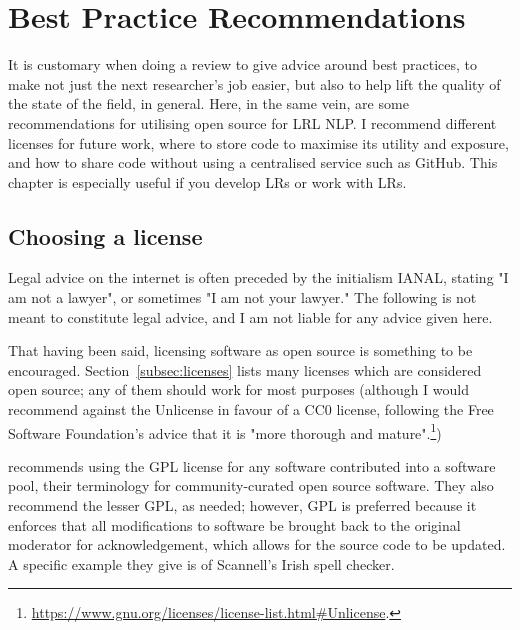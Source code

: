 \section{Best Practice Recommendations}
\label{sec:methods}

It is customary when doing a review to give advice around best practices, to make not just the next researcher's job easier, but also to help lift the quality of the state of the field, in general. Here, in the same vein, are some recommendations for utilising open source for LRL NLP. I recommend different licenses for future work, where to store code to maximise its utility and exposure, and how to share code without using a centralised service such as GitHub. This chapter is especially useful if you develop LRs or work with LRs. 

\subsection{Choosing a license}
\label{choosing-a-license}

Legal advice on the internet is often preceded by the initialism IANAL, stating "I am not a lawyer", or sometimes "I am not your lawyer." The following is not meant to constitute legal advice, and I am not liable for any advice given here.

That having been said, licensing software as open source is something to be encouraged. Section~\ref{subsec:licenses} lists many licenses which are considered open source; any of them should work for most purposes (although I would recommend against the Unlicense in favour of a CC0 license, following the Free Software Foundation's advice that it is "more thorough and mature".\footnote{\href{https://www.gnu.org/licenses/license-list.html\#Unlicense}{https://www.gnu.org/licenses/license-list.html\#Unlicense}. })

\citet{streiter2006implementing} recommends using the GPL license for any software contributed into a software pool, their terminology for community-curated open source software. They also recommend the lesser GPL, as needed; however, GPL is preferred because it enforces that all modifications to software be brought back to the original moderator for acknowledgement, which allows for the source code to be updated. A specific example they give is of Scannell's Irish spell checker.

